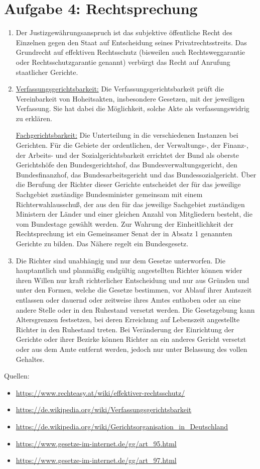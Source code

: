 \documentclass{article}
\begin{document}
	\section*{Aufgabe 4: Rechtsprechung}
	\begin{enumerate}[label=(\alph*)]
		\item Der Justizgewährungsanspruch ist das subjektive öffentliche Recht des Einzelnen gegen den Staat auf Entscheidung seines Privatrechtsstreits. Das Grundrecht auf effektiven Rechtsschutz (bisweilen auch Rechtsweggarantie oder Rechtsschutzgarantie genannt) verbürgt das Recht auf Anrufung staatlicher Gerichte.
		\item \underline{Verfassungsgerichtsbarkeit:} Die Verfassungsgerichtsbarkeit prüft die Vereinbarkeit von Hoheitsakten, insbesondere Gesetzen, mit der jeweiligen Verfassung. Sie hat dabei die Möglichkeit, solche Akte als verfassungswidrig zu erklären.
		
		\underline{Fachgerichtsbarkeit:} Die Unterteilung in die verschiedenen Instanzen bei Gerichten. Für die Gebiete der ordentlichen, der Verwaltungs-, der Finanz-, der Arbeits- und der Sozialgerichtsbarkeit errichtet der Bund als oberste Gerichtshöfe den Bundesgerichtshof, das Bundesverwaltungsgericht, den Bundesfinanzhof, das Bundesarbeitsgericht und das Bundessozialgericht. Über die Berufung der Richter dieser Gerichte entscheidet der für das jeweilige Sachgebiet zuständige Bundesminister gemeinsam mit einem Richterwahlausschuß, der aus den für das jeweilige Sachgebiet zuständigen Ministern der Länder und einer gleichen Anzahl von Mitgliedern besteht, die vom Bundestage gewählt werden. Zur Wahrung der Einheitlichkeit der Rechtsprechung ist ein Gemeinsamer Senat der in Absatz 1 genannten Gerichte zu bilden. Das Nähere regelt ein Bundesgesetz.
		\item Die Richter sind unabhängig und nur dem Gesetze unterworfen. Die hauptamtlich und planmäßig endgültig angestellten Richter können wider ihren Willen nur kraft richterlicher Entscheidung und nur aus Gründen und unter den Formen, welche die Gesetze bestimmen, vor Ablauf ihrer Amtszeit entlassen oder dauernd oder zeitweise ihres Amtes enthoben oder an eine andere Stelle oder in den Ruhestand versetzt werden. Die Gesetzgebung kann Altersgrenzen festsetzen, bei deren Erreichung auf Lebenszeit angestellte Richter in den Ruhestand treten. Bei Veränderung der Einrichtung der Gerichte oder ihrer Bezirke können Richter an ein anderes Gericht versetzt oder aus dem Amte entfernt werden, jedoch nur unter Belassung des vollen Gehaltes.
	\end{enumerate}

	Quellen:
	\begin{itemize}
		\item \url{https://www.rechteasy.at/wiki/effektiver-rechtsschutz/}
		\item \url{https://de.wikipedia.org/wiki/Verfassungsgerichtsbarkeit}
		\item \url{https://de.wikipedia.org/wiki/Gerichtsorganisation_in_Deutschland}
		\item \url{https://www.gesetze-im-internet.de/gg/art_95.html}
		\item \url{https://www.gesetze-im-internet.de/gg/art_97.html}
	\end{itemize}
	
\end{document}
